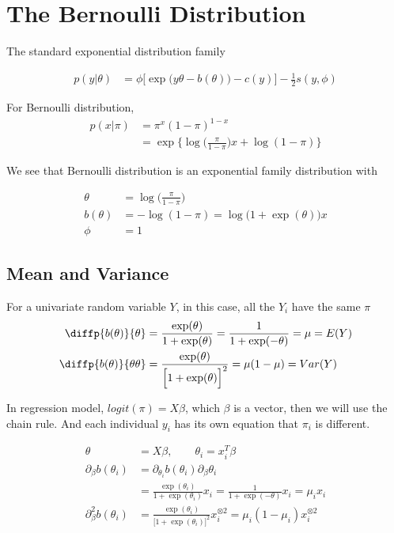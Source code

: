 \section{The Bernoulli Distribution}

The standard exponential distribution family 

\begin{align*}
p(y| \theta) &= \phi \Big[ \exp \Big( y \theta - b(\theta) \Big) - c(y) \Big] - \frac{1}{2} s(y, \phi)
\end{align*}

For Bernoulli distribution,
\begin{align*}
p(x| \pi) &= \pi^{x} (1- \pi)^{1-x} \\
&= \exp \{ \log \Big( \frac{\pi}{1- \pi} \Big) x + \log (1 - \pi) \}
\end{align*}

We see that Bernoulli distribution is an exponential family distribution with 

\begin{align*}
\theta &= \log \Big( \frac{\pi}{1- \pi} \Big) \\
b(\theta)&=- \log (1 - \pi) =  \log \Big( 1 + \exp(\theta) \Big) x \\
\phi & = 1
\end{align*}

\subsection{Mean and Variance}

For a univariate random variable $Y$, in this case, all the $Y_i$ have the same $\pi$
\begin{align*}
\diffp{b(\theta)}{\theta} &= \frac{\exp(\theta)}{1 + \exp(\theta) } = \frac{1}{1 + \exp(-\theta)} = \mu = E(Y) \\
\diffp{b(\theta)}{\theta \theta}  &= \frac{\exp(\theta)}{\Big[ 1 + \exp(\theta) \Big]^2} = \mu(1-\mu) =Var(Y)
\end{align*}

In regression model, $logit (\pi) = X \beta$, which $\beta$ is a vector, then we will use the chain rule. And each individual $y_i$ has its own equation that $\pi_i$ is different.

\begin{align*}
\theta & = X \beta, \qquad \theta_i = x_i^{T} \beta \\
\partial_{\beta}{b(\theta_i)} &= \partial_{\theta_i}{b(\theta_i)} \partial_{\beta}{{\theta_i}} \\
&= \frac{\exp(\theta_i)}{1 + \exp(\theta_i) }  x_i= \frac{1}{1 + \exp(-\theta)} x_i= \mu_i x_i\\
\partial^2_{\beta}{{b(\theta_i)}} &= \frac{\exp(\theta_i)}{\Big[ 1 + \exp(\theta_i) \Big]^2} x_i^{\otimes 2}= \mu_i(1-\mu_i) x_i^{\otimes 2}
\end{align*}

